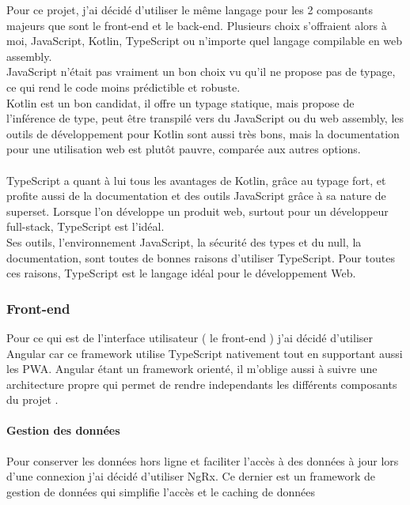 Pour ce projet, j'ai décidé d'utiliser le même langage pour les 2 composants majeurs que sont le front-end et le back-end.
Plusieurs choix s'offraient alors à moi, JavaScript, Kotlin, TypeScript ou n'importe quel langage compilable en web assembly.\\

JavaScript n'était pas vraiment un bon choix vu qu'il ne propose pas de typage, ce qui rend le code moins prédictible et robuste.\\

Kotlin est un bon candidat, il offre un typage statique, mais propose de l'inférence de type, peut être transpilé vers du JavaScript ou du web assembly,
les outils de développement pour Kotlin sont aussi très bons, mais la documentation pour une utilisation web est plutôt pauvre, comparée aux autres options.\\\\

TypeScript a quant à lui tous les avantages de Kotlin, grâce au typage fort, et profite aussi de la documentation et des outils JavaScript grâce à sa nature de superset.
Lorsque l'on développe un produit web, surtout pour un développeur full-stack, TypeScript est l'idéal.\\
Ses outils, l'environnement JavaScript, la sécurité des types et du null, la documentation, sont toutes de bonnes raisons d'utiliser TypeScript.
Pour toutes ces raisons, TypeScript est le langage idéal pour le développement Web.

\subsubsection{Front-end}\label{subsec:front-end}
Pour ce qui est de l'interface utilisateur ( le front-end ) j'ai décidé d'utiliser Angular car ce framework utilise TypeScript nativement tout en supportant aussi les PWA\@.
Angular étant un framework orienté, il m'oblige aussi à suivre une architecture propre qui permet de rendre independants les différents composants du projet .

\paragraph{Gestion des données}
Pour conserver les données hors ligne et faciliter l'accès à des données à jour lors d'une connexion j'ai décidé d'utiliser NgRx.
Ce dernier est un framework de gestion de données qui simplifie l'accès et le caching de données

